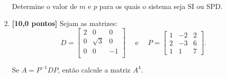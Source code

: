 \documentclass[12pt,a4paper]{article}
\begin{document}
\begin{enumerate}
  Determine o valor de $m$ e $p$ para os quais o sistema seja SI ou SPD.
    
  \item \textbf{[10,0 pontos]} Sejam as matrizes:
  $$
    D =
      \begin{bmatrix}
        2 & 0 & 0 \\
        0 & \sqrt{3} & 0 \\
        0 & 0 & -1 \\
      \end{bmatrix}\quad \textrm{ e }\quad
    P =
      \begin{bmatrix}
        1 & -2 & 2\\
        2 & -3 & 6\\
        1 & 1 & 7
      \end{bmatrix}.
  $$
  
  Se $A = P^{-1}DP$, então calcule a matriz $A^4$.

  \end{enumerate}
\end{document}
